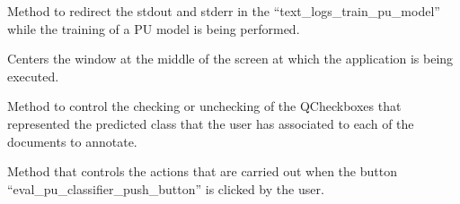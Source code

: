 \documentclass[letterpaper,10pt,english]{sphinxmanual}
\begin{document}
\begin{fulllineitems}
\begin{fulllineitems}
\label{\detokenize{gui_main_window:src.graphical_user_interface.main_window.MainWindow.append_text_train}}
\sphinxAtStartPar
Method to redirect the stdout and stderr in the “text\_logs\_train\_pu\_model”
while the training of a PU model is being performed.

\end{fulllineitems}


\begin{fulllineitems}
\label{\detokenize{gui_main_window:src.graphical_user_interface.main_window.MainWindow.center}}
\sphinxAtStartPar
Centers the window at the middle of the screen at which the application is being executed.

\end{fulllineitems}


\begin{fulllineitems}
\label{\detokenize{gui_main_window:src.graphical_user_interface.main_window.MainWindow.clicked_change_predicted_class}}
\sphinxAtStartPar
Method to control the checking or unchecking of the QCheckboxes that represented
the predicted class that the user has associated to each of the documents to annotate.

\end{fulllineitems}


\begin{fulllineitems}
\label{\detokenize{gui_main_window:src.graphical_user_interface.main_window.MainWindow.clicked_evaluate_PU_model}}
\sphinxAtStartPar
Method that controls the actions that are carried out when the button “eval\_pu\_classifier\_push\_button” is
clicked by the user.


\end{fulllineitems}
\end{fulllineitems}
\end{document}
